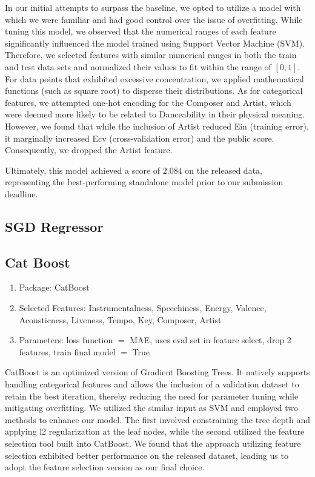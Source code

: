 \documentclass[10pt,letterpaper]{article}
\begin{document}
In our initial attempts to surpass the baseline, 
we opted to utilize a model with which we were familiar and had good control over the issue of overfitting. 
While tuning this model, we observed that the numerical ranges of each feature significantly influenced the model trained using Support Vector Machine (SVM). 
Therefore, we selected features with similar numerical ranges in both the train and test data sets and normalized their values to fit within the range of $[0, 1]$. 
For data points that exhibited excessive concentration, we applied mathematical functions (such as square root) to disperse their distributions. 
As for categorical features, we attempted one-hot encoding for the Composer and Artist, 
which were deemed more likely to be related to Danceability in their physical meaning. 
However, we found that while the inclusion of Artist reduced Ein (training error), 
it marginally increased Ecv (cross-validation error) and the public score. 
Consequently, we dropped the Artist feature.

Ultimately, this model achieved a score of $2.084$ on the released data, 
representing the best-performing standalone model prior to our submission deadline.

\subsection{SGD Regressor}
\subsection{Cat Boost}
\begin{enumerate}
	\item Package: CatBoost
	\item Selected Features: Instrumentalness, Speechiness, Energy, Valence, Acousticness, Liveness, Tempo, Key, Composer, Artist
	\item Parameters: loss function $=$ MAE, uses eval set in feature select, drop 2 features, train final model $=$ True
\end{enumerate}

CatBoost is an optimized version of Gradient Boosting Trees. 
It natively supports handling categorical features and allows the inclusion of a validation dataset to retain the best iteration, 
thereby reducing the need for parameter tuning while mitigating overfitting. 
We utilized the similar input as SVM and employed two methods to enhance our model. 
The first involved constraining the tree depth and applying l2 regularization at the leaf nodes, 
while the second utilized the feature selection tool built into CatBoost. 
We found that the approach utilizing feature selection exhibited better performance on the released dataset, 
leading us to adopt the feature selection version as our final choice.
\end{document}
